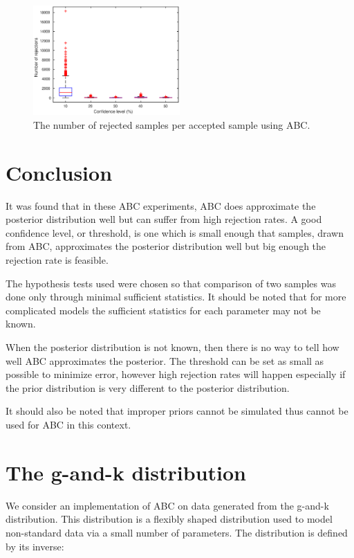 \documentclass[a4paper,10pt]{article}
\begin{document}
\begin{figure}
\centering
\includegraphics[width=0.5\textwidth]{rejections.eps}
\caption{The number of rejected samples per accepted sample using ABC.}
\label{rejections}
\end{figure}





\section{Conclusion}
It was found that in these ABC experiments, ABC does approximate the posterior distribution well but can suffer from high rejection rates. A good confidence level, or threshold, is one which is small enough that samples, drawn from ABC, approximates the posterior distribution well but big enough the rejection rate is feasible.

The hypothesis tests used were chosen so that comparison of two samples was done only through minimal sufficient statistics. It should be noted that for more complicated models the sufficient statistics for each parameter may not be known.

When the posterior distribution is not known, then there is no way to tell how well ABC approximates the posterior. The threshold can be set as small as possible to minimize error, however high rejection rates will happen especially if the prior distribution is very different to the posterior distribution.

It should also be noted that improper priors cannot be simulated thus cannot be used for ABC in this context.


\section{The g-and-k distribution}
We consider an implementation of ABC on data generated from the g-and-k distribution. This distribution is a flexibly shaped distribution used to model non-standard data via a small number of parameters. The distribution is defined by its inverse:
\end{document}
